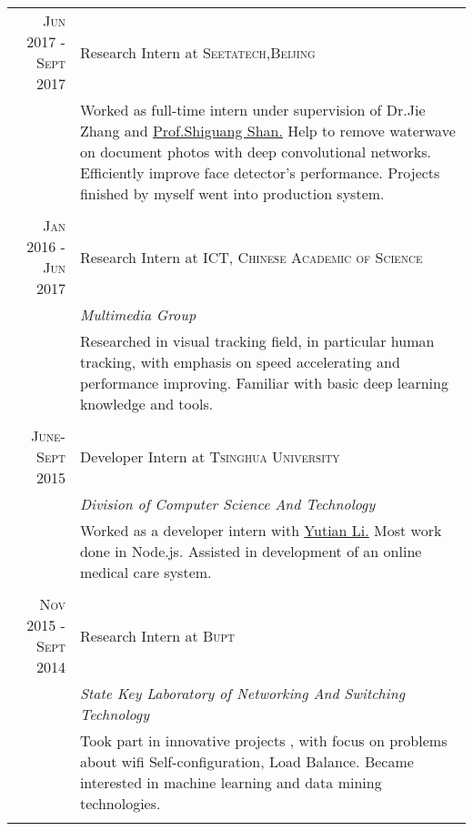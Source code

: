 \documentclass[a4paper,10pt]{article}
\begin{document}
\begin{tabular}{r|p{11cm}}

 \textsc{Jun 2017 - Sept 2017} & Research Intern at \textsc{Seetatech,Beijing} \\&\footnotesize{Worked as full-time intern under supervision of Dr.Jie Zhang and} \href{http://www.jdl.ac.cn/user/sgshan/index_en.htm}{Prof.Shiguang Shan.} \footnotesize{Help to remove waterwave on document photos with deep convolutional networks. Efficiently improve face detector's performance. Projects finished by myself went into production system.}\\\multicolumn{2}{c}{} \\

 \textsc{Jan 2016 - Jun 2017} & Research Intern at \textsc{ICT, Chinese Academic of Science} \\&\emph{Multimedia Group}\\&\footnotesize{Researched in visual tracking field, in particular human tracking, with emphasis on speed accelerating and performance improving. Familiar with basic deep learning knowledge and tools.}\\\multicolumn{2}{c}{} \\
 \textsc{June-Sept 2015} & Developer Intern at \textsc{Tsinghua University}  \\&\emph{Division of Computer Science And Technology}\\& \footnotesize{Worked as a developer intern with }\href{https://yutian.li/}{Yutian Li.} \footnotesize{Most work done in Node.js. Assisted in development of an online medical care system.}\\\multicolumn{2}{c}{} \\
 \textsc{Nov 2015 - Sept 2014} & Research Intern at \textsc{Bupt}  \\&\emph{State Key Laboratory of Networking And Switching Technology}\\&\footnotesize{Took part in innovative projects , with focus on problems about wifi Self-configuration, Load Balance. Became interested in machine learning and data mining technologies.}\\\multicolumn{2}{c}{} \\
\end{tabular}
\end{document}
